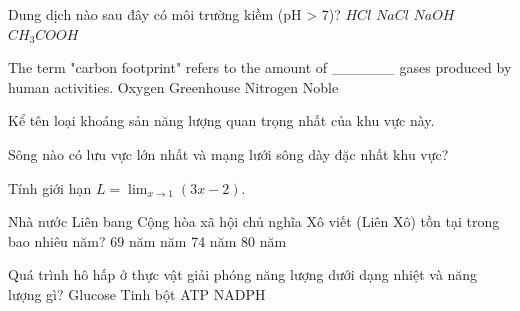 \begin{ex}
    Dung dịch nào sau đây có môi trường kiềm (pH > 7)?
    \choice
    {$HCl$}
    {$NaCl$}
    {\True $NaOH$}
    {$CH_3COOH$}
\end{ex}

\begin{ex}
    The term "carbon footprint" refers to the amount of ______ gases produced by human activities.
    \choice
    {Oxygen}
    {\True Greenhouse}
    {Nitrogen}
    {Noble}
\end{ex}

\begin{ex}
    \begin{chc}
        Kể tên loại khoáng sản năng lượng quan trọng nhất của khu vực này.
    \end{chc}
    \begin{chc}
        Sông nào có lưu vực lớn nhất và mạng lưới sông dày đặc nhất khu vực?
    \end{chc}
\end{ex}

\begin{ex}
    Tính giới hạn $L = \lim_{x \to 1} (3x - 2)$.
\end{ex}

\begin{ex}
    Nhà nước Liên bang Cộng hòa xã hội chủ nghĩa Xô viết (Liên Xô) tồn tại trong bao nhiêu năm?
    \choice
    {69 năm}
    { năm}
    {74 năm}
    {80 năm}
\end{ex}

\begin{ex}
    Quá trình hô hấp ở thực vật giải phóng năng lượng dưới dạng nhiệt và năng lượng gì?
    \choice
    {Glucose}
    {Tinh bột}
    {\True ATP}
    {NADPH}
\end{ex}

